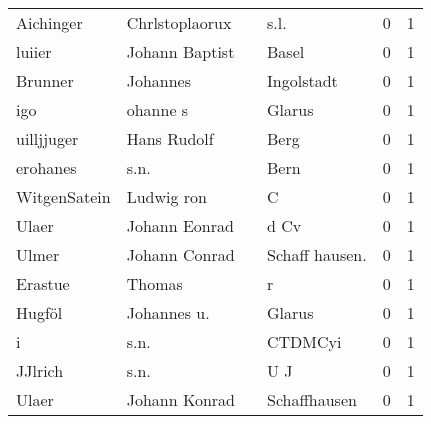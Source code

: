 \begin{tabular}{llllrr}
                Aichinger &                     Chrlstoplaorux &             &                                        s.l. &          0 &         1 \\
                   luiier &                     Johann Baptist &             &                                       Basel &          0 &         1 \\
                  Brunner &                           Johannes &             &                                  Ingolstadt &          0 &         1 \\
                      igo &                           ohanne s &             &                                      Glarus &          0 &         1 \\
               uilljjuger &                        Hans Rudolf &             &                                        Berg &          0 &         1 \\
                 erohanes &                               s.n. &             &                                        Bern &          0 &         1 \\
             WitgenSatein &                         Ludwig ron &             &                                           C &          0 &         1 \\
                    Ulaer &                      Johann Eonrad &             &                                        d Cv &          0 &         1 \\
                    Ulmer &                      Johann Conrad &             &                             Schaff hausen.  &          0 &         1 \\
                  Erastue &                             Thomas &             &                                           r &          0 &         1 \\
                   Hugföl &                        Johannes u. &             &                                      Glarus &          0 &         1 \\
                        i &                               s.n. &             &                                     CTDMCyi &          0 &         1 \\
                  JJlrich &                               s.n. &             &                                         U J &          0 &         1 \\
                    Ulaer &                      Johann Konrad &             &                                Schaffhausen &          0 &         1 \\

\end{tabular}
